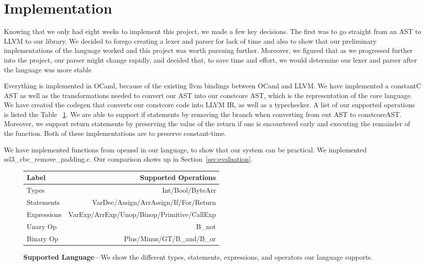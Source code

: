 \section{Implementation}
\label{sec:implementation}

Knowing that we only had eight weeks to implement this project, we made a few
key decisions. The first was to go straight from an AST to LLVM to our library.
We decided to forego creating a lexer and parser for lack of time and also to
show that our preliminary implementations of the language worked and this
project was worth pursuing further. Moreover, we figured that as we progressed
further into the project, our parser might change rapidly, and decided that, to
save time and effort, we would determine our lexer and parser after the language
was more stable

Everything is implemented in OCaml\cite{ocaml}, because of the existing llvm
bindings between OCaml and LLVM.  We have implemented a constantC AST as well as
the transformations needed to convert our AST into our constcore AST, which is
the representation of the core language.  We have created the codegen that
converts our constcore code into LLVM IR, as well as a typechecker. A list of
our supported operations is listed the Table ~\ref{table:functions}. We are able
to support if statements by removing the branch when converting from out AST to
constcoreAST. Moreover, we support return statements by preserving the value of
the return if one is encourtered early and executing the remainder of the
function. Both of these implementations are to preserve constant-time.

We have implemented functions from openssl in our language, to show that our
system can be practical. We implemented ssl3\_cbc\_remove\_padding.c. Our
comparison shows up in Section~\ref{sec:evaluation}.

\begin{figure}
        \centering
        \small
        \begin{tabularx}{\columnwidth}{lr}
        \toprule
        Label & Supported Operations\\
        \midrule
        Types &  Int/Bool/ByteArr \\
        Statements & VarDec/Assign/ArrAssign/If/For/Return \\
        Expressions & VarExp/ArrExp/Unop/Binop/Primitive/CallExp \\
        Unary Op &  B\_not \\
        Binary Op & Plus/Minus/GT/B\_and/B\_or \\
        \bottomrule
        \end{tabularx}
        \caption{\textbf{Supported Language}---We show the different types,
        statements, expressions, and operators our language supports.}
    \label{table:functions}
\end{figure}

